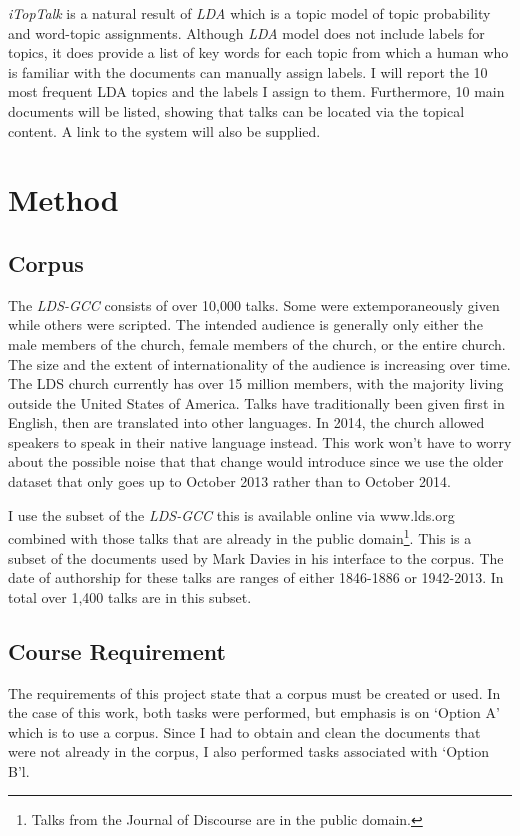 \emph{iTopTalk} is a natural result of \emph{LDA} which is a topic model of topic probability and word-topic assignments. Although \emph{LDA} model does not include labels for topics, it does provide a list of key words for each topic from which a human who is familiar with the documents can manually assign labels. I will report the 10 most frequent LDA topics and the labels I assign to them. Furthermore, 10 main documents will be listed, showing that talks can be located via the topical content. A link to the system will also be supplied.


\section {Method}

\subsection{Corpus}
The \emph{LDS-GCC} consists of over 10,000 talks. Some were extemporaneously given while others were scripted. The intended audience is generally only either the male members of the church, female members of the church, or the entire church. The size and the extent of internationality of the audience is increasing over time. The LDS church currently has over 15 million members, with the majority living outside the United States of America. Talks have traditionally been given first in English, then are translated into other languages. In 2014, the church allowed speakers to speak in their native language instead. This work won't have to worry about the possible noise that that change would introduce since we use the older dataset that only goes up to October 2013 rather than to October 2014. 

I use the subset of the \emph{LDS-GCC} this is available online via www.lds.org combined with those talks that are already in the public domain\footnote{Talks from the Journal of Discourse are in the public domain.}. This is a subset of the documents used by Mark Davies in his interface to the corpus. The date of authorship for these talks are ranges of either 1846-1886 or 1942-2013. In total over 1,400 talks are in this subset. 

\subsection{Course Requirement}
The requirements of this project state that a corpus must be created or used. In the case of this work, both tasks were performed, but emphasis is on `Option A' which is to use a corpus. Since I had to obtain and clean the documents that were not already in the corpus, I also performed tasks associated with `Option B'l. 

